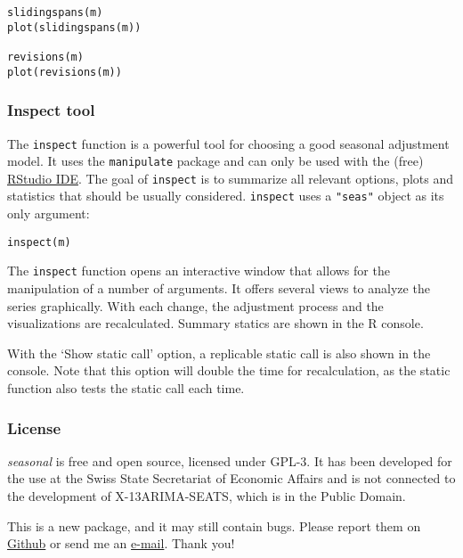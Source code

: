\begin{verbatim}
slidingspans(m)
plot(slidingspans(m))

revisions(m)
plot(revisions(m))
\end{verbatim}

\subsubsection{Inspect tool}\label{inspect-tool}

The \texttt{inspect} function is a powerful tool for choosing a good
seasonal adjustment model. It uses the \texttt{manipulate} package and
can only be used with the (free)
\href{http://www.rstudio.com/ide/}{RStudio IDE}. The goal of
\texttt{inspect} is to summarize all relevant options, plots and
statistics that should be usually considered. \texttt{inspect} uses a
\texttt{"seas"} object as its only argument:

\begin{verbatim}
inspect(m)
\end{verbatim}

The \texttt{inspect} function opens an interactive window that allows
for the manipulation of a number of arguments. It offers several views
to analyze the series graphically. With each change, the adjustment
process and the visualizations are recalculated. Summary statics are
shown in the R console.

With the `Show static call' option, a replicable static call is also
shown in the console. Note that this option will double the time for
recalculation, as the static function also tests the static call each
time.

\subsubsection{License}\label{license}

\emph{seasonal} is free and open source, licensed under GPL-3. It has
been developed for the use at the Swiss State Secretariat of Economic
Affairs and is not connected to the development of X-13ARIMA-SEATS,
which is in the Public Domain.

This is a new package, and it may still contain bugs. Please report them
on \href{https://github.com/christophsax/seasonal}{Github} or send me an
\href{mailto:christoph.sax@gmail.com}{e-mail}. Thank you!
